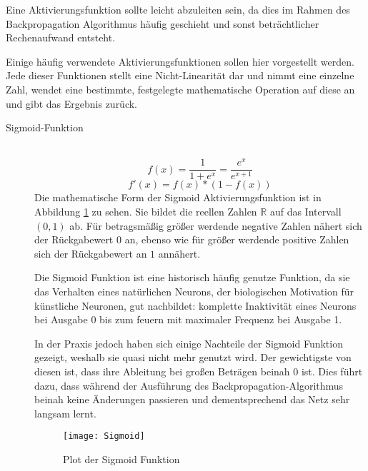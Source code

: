 Eine Aktivierungsfunktion sollte leicht abzuleiten sein, 
da dies im Rahmen des Backpropagation Algorithmus häufig geschieht und sonst beträchtlicher Rechenaufwand entsteht.

Einige häufig verwendete Aktivierungsfunktionen sollen hier vorgestellt werden.
Jede dieser Funktionen stellt eine Nicht-Linearität dar und nimmt eine einzelne Zahl, wendet eine bestimmte, festgelegte mathematische 
Operation auf diese an und gibt das Ergebnis zurück.

\begin{description}
	\item[Sigmoid-Funktion] \hfill \\
		\begin{equation}
			f(x) = \frac{1}{1 + e^x} = \frac{e^x}{e^{x + 1}}
			\label{func:Sigmoid}
		\end{equation}
		\begin{equation}
			f'(x) = f(x) * (1 - f(x))
		\end{equation}
		Die mathematische Form der Sigmoid Aktivierungsfunktion ist in Abbildung \ref{sigmoidFunc} zu sehen.
		Sie bildet die reellen Zahlen $\mathbb{R}$ auf das Intervall $(0,1)$ ab. 
		Für betragsmäßig größer werdende negative Zahlen nähert sich der Rückgabewert $0$ an,
		ebenso wie für größer werdende positive Zahlen sich der Rückgabewert an $1$ annähert.

		Die Sigmoid Funktion ist eine historisch häufig genutze Funktion, da sie das Verhalten eines natürlichen Neurons,
		der biologischen Motivation für künstliche Neuronen, gut nachbildet:
		komplette Inaktivität eines Neurons bei Ausgabe 0 bis zum feuern mit maximaler Frequenz bei Ausgabe 1.

		In der Praxis jedoch haben sich einige Nachteile der Sigmoid Funktion gezeigt, weshalb sie quasi nicht mehr genutzt wird.
		Der gewichtigste von diesen ist, dass ihre Ableitung bei großen Beträgen beinah $0$ ist.
		Dies führt dazu, dass während der Ausführung des Backpropagation-Algorithmus beinah keine Änderungen passieren und dementsprechend das Netz sehr langsam lernt.
		
		\begin{figure}
			\centering
			\texttt{[image: Sigmoid]}
			\caption{Plot der Sigmoid Funktion}
			\label{sigmoidFunc}
		\end{figure}
		  



\end{description}
